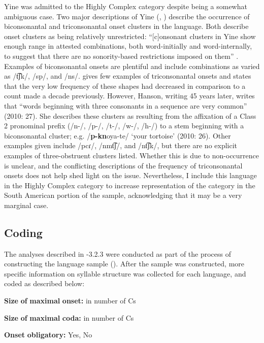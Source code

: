   Yine was admitted to the Highly Complex category despite being a somewhat ambiguous case. Two major descriptions of Yine (\citealt{Hanson2010}, \citealt{Matteson1965}) describe the occurrence of biconsonantal and triconsonantal onset clusters in the language. Both describe onset clusters as being relatively unrestricted: “[c]onsonant clusters in Yine show enough range in attested combinations, both word-initially and word-internally, to suggest that there are no sonority-based restrictions imposed on them” \citep[27]{Hanson2010}. Examples of biconsonantal onsets are plentiful and include combinations as varied as /t͡ʃk/, /sp/, and /ns/. \citet[24]{Matteson1965} gives few examples of triconsonantal onsets and states that the very low frequency of these shapes had decreased in comparison to a count made a decade previously. However, Hanson, writing 45 years later, writes that “words beginning with three consonants in a sequence are very common” (2010: 27). She describes these clusters as resulting from the affixation of a Class 2 pronominal prefix (/n-/, /p-/, /t-/, /w-/, /h-/) to a stem beginning with a biconsonantal cluster; e.g. /\textbf{p-kn}oya-te/ ‘your tortoise’ (2010: 26). Other examples given include /pcɾ/, /nmt͡ʃ/, and /nt͡ʃk/, but there are no explicit examples of three-obstruent clusters listed. Whether this is due to non-occurrence is unclear, and the conflicting descriptions of the frequency of triconsonantal onsets does not help shed light on the issue. Nevertheless, I include this language in the Highly Complex category to increase representation of the category in the South American portion of the sample, acknowledging that it may be a very marginal case.

\subsection{Coding}\label{sec:3.2.4}

  The analyses described in -3.2.3 were conducted as part of the process of constructing the language sample (). After the sample was constructed, more specific information on syllable structure was collected for each language, and coded as described below:

\textbf{Size} \textbf{of} \textbf{maximal} \textbf{onset:} in number of Cs

\textbf{Size} \textbf{of} \textbf{maximal} \textbf{coda:} in number of Cs

\textbf{Onset} \textbf{obligatory:} Yes, No


